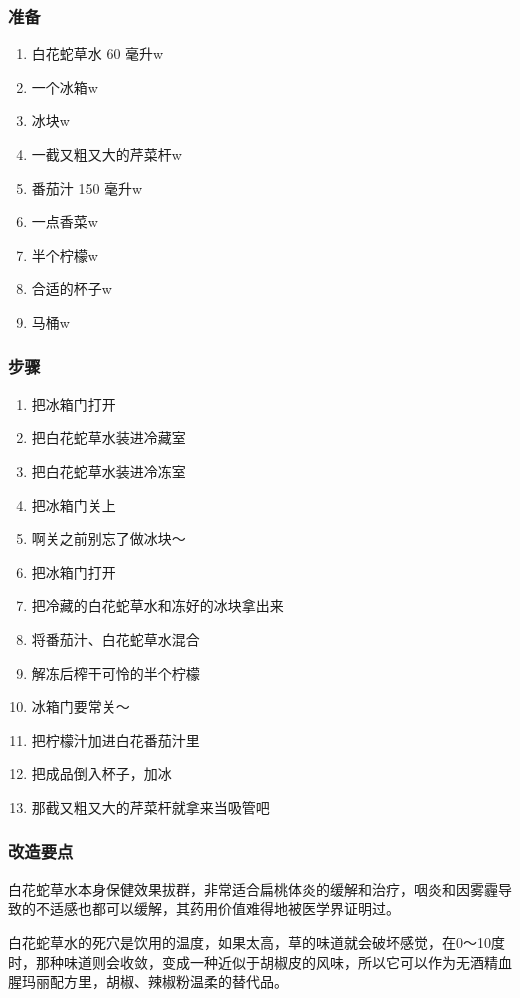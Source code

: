 \documentclass[12pt, a4paper]{ctexart}
\begin{document}
\subsubsection{准备}
\begin{enumerate}
    \item{白花蛇草水 60 毫升w}
    \item{一个冰箱w}
    \item{冰块w}
    \item{一截又粗又大的芹菜杆w}
    \item{番茄汁 150 毫升w}
    \item{一点香菜w}
    \item{半个柠檬w}
    \item{合适的杯子w}
    \item{马桶w}
\end{enumerate}

\subsubsection{步骤}
\begin{enumerate}
    \item{把冰箱门打开}
    \item{把白花蛇草水装进冷藏室}
    \item{把白花蛇草水装进冷冻室}
    \item{把冰箱门关上}
    \item{啊关之前别忘了做冰块～}
    \item{把冰箱门打开}
    \item{把冷藏的白花蛇草水和冻好的冰块拿出来}
    \item{将番茄汁、白花蛇草水混合}
    \item{解冻后榨干可怜的半个柠檬}
    \item{冰箱门要常关～}
    \item{把柠檬汁加进白花番茄汁里}
    \item{把成品倒入杯子，加冰}
    \item{那截又粗又大的芹菜杆就拿来当吸管吧}
\end{enumerate}

\subsubsection{改造要点}
白花蛇草水本身保健效果拔群，非常适合扁桃体炎的缓解和治疗，咽炎和因雾霾导致的不适感也都可以缓解，其药用价值难得地被医学界证明过。

白花蛇草水的死穴是饮用的温度，如果太高，草的味道就会破坏感觉，在0～10度时，那种味道则会收敛，变成一种近似于胡椒皮的风味，所以它可以作为无酒精血腥玛丽配方里，胡椒、辣椒粉温柔的替代品。
\end{document}

